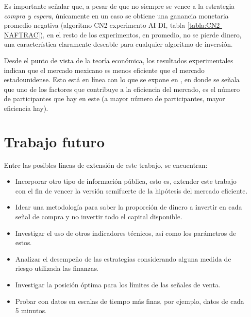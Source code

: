 \documentclass[12pt]{report}
\theoremstyle{break}
\theoremstyle{break}
\begin{document}
Es importante señalar que, a pesar de que no siempre se vence a la estrategia \textit{compra y espera}, únicamente en un caso se obtiene una ganancia monetaria promedio negativa (algoritmo CN2 experimento AI-DI, tabla \ref{tabla:CN2-NAFTRAC}), en el resto de los experimentos, en promedio, no se pierde dinero, una característica claramente deseable para cualquier algoritmo de inversión.

Desde el punto de vista de la teoría económica, los resultados experimentales indican que el mercado mexicano es menos eficiente que el mercado estadounidense. Esto está en línea con lo que se expone en \cite{CFA2019}, en donde se señala que uno de los factores que contribuye a la eficiencia del mercado, es el número de participantes que hay en este (a mayor número de participantes, mayor eficiencia hay).



\section{Trabajo futuro}
\label{seccion:trabajo futuro}
Entre las posibles líneas de extensión de este trabajo, se encuentran:

\begin{itemize}
\item Incorporar otro tipo de información pública, esto es, extender este trabajo con el fin de vencer la versión semifuerte de la hipótesis del mercado eficiente.

\item Idear una metodología para saber la proporción de dinero a invertir en cada señal de compra y no invertir todo el capital disponible.

\item Investigar el uso de otros indicadores técnicos, así como los parámetros de estos.

\item Analizar el desempeño de las estrategias considerando alguna medida de riesgo utilizada las finanzas.

\item Investigar la posición óptima para los límites de las señales de venta.

\item Probar con datos en escalas de tiempo más finas, por ejemplo, datos de cada 5 minutos.
\end{itemize}




\nocite{Preen2010}
\nocite{Kuo2013}
\nocite{Wang2014}
\nocite{Hu2015} %
\end{document}
